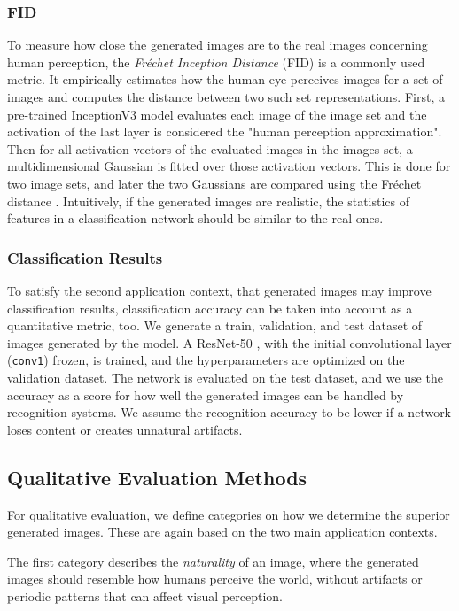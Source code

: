 \documentclass[a4paper,11pt, DIV=12]{scrartcl}
\begin{document}
\subsubsection*{FID}
To measure how close the generated images are to the real images concerning human perception, the \textit{Fréchet Inception Distance} (FID) \cite{ttur} is a commonly used metric.
It empirically estimates how the human eye perceives images for a set of images and computes the distance between two such set representations.
First, a pre-trained InceptionV3 model evaluates each image of the image set and the activation of the last layer is considered the "human perception approximation".
Then for all activation vectors of the evaluated images in the images set, a multidimensional Gaussian is fitted over those activation vectors.
This is done for two image sets, and later the two Gaussians are compared using the Fréchet distance \cite{ttur}.
Intuitively, if the generated images are realistic, the statistics of features in a classification network should be similar to the real ones.

\subsubsection*{Classification Results}
To satisfy the second application context, that generated images may improve classification results, classification accuracy can be taken into account as a quantitative metric, too.
We generate a train, validation, and test dataset of images generated by the model.
A ResNet-50 \cite{resnet}, with the initial convolutional layer (\texttt{conv1}) frozen, is trained, and the hyperparameters are optimized on the validation dataset.
The network is evaluated on the test dataset, and we use the accuracy as a score for how well the generated images can be handled by recognition systems.
We assume the recognition accuracy to be lower if a network loses content or creates unnatural artifacts.

\subsection{Qualitative Evaluation Methods}
For qualitative evaluation, we define categories on how we determine the superior generated images. These are again based on the two main application contexts.

The first category describes the \textit{naturality} of an image, where the generated images should resemble how humans perceive the world, without artifacts or periodic patterns that can affect visual perception.
\end{document}

